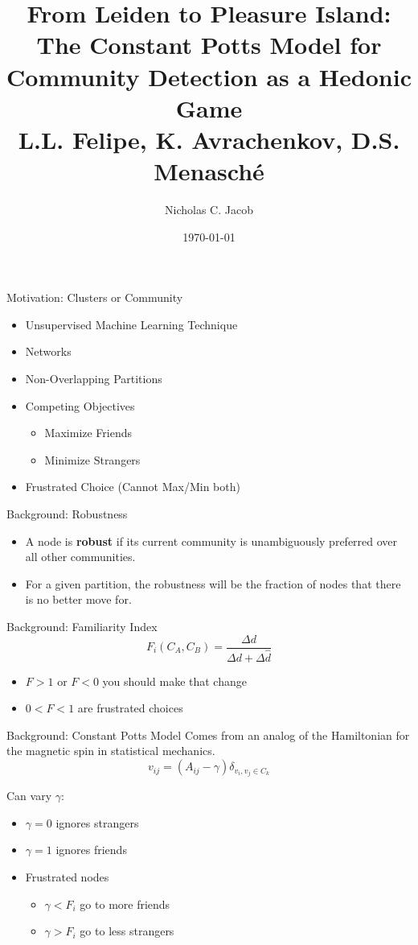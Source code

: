 \documentclass[xcolor=pdftex,dvipsnames,table]{beamer}
\title[Community Detection] 
{From Leiden to Pleasure Island:  The Constant Potts Model for Community Detection as a Hedonic Game\\ L.L. Felipe, K. Avrachenkov, D.S. Menasch\'e}
\author{Nicholas C. Jacob}
\date{\today}
\begin{document}
\begin{frame}
\maketitle
\nocite{FELIPE2025130989}
\end{frame}
\begin{frame}{Motivation:  Clusters or Community}
\begin{itemize}
\item Unsupervised Machine Learning Technique
\item Networks
\item Non-Overlapping Partitions
\item Competing Objectives
\begin{itemize}
\item Maximize Friends
\item Minimize Strangers
\end{itemize} 
\item Frustrated Choice (Cannot Max/Min both)
\end{itemize}
\end{frame}

\begin{frame}{Background:  Robustness}
\begin{itemize}
\item A node is {\bf robust} if its current community is unambiguously preferred over all other communities.

\item For a given partition, the robustness will be the fraction of nodes that there is no better move for.
\end{itemize}
\end{frame}
\begin{frame}{Background:  Familiarity Index}
\[
F_i(C_A,C_B) = \frac{\Delta d}{\Delta d + \Delta \hat d}
\]
\begin{itemize}
\item $F>1$ or $F<0$ you should make that change
\item $0<F<1$ are frustrated choices
\end{itemize}
\end{frame}

\begin{frame}{Background:  Constant Potts Model}
Comes from an analog of the Hamiltonian for the magnetic spin in statistical mechanics.
\[
v_{ij} = \left(A_{ij} - \gamma\right)\delta_{v_i,v_j\in C_k}
\]

Can vary $\gamma$:
\begin{itemize}
\item $\gamma = 0$ ignores strangers
\item $\gamma = 1$ ignores friends
\item Frustrated nodes 
\begin{itemize}
\item $\gamma<F_i$ go to more friends
\item $\gamma>F_i$ go to less strangers
\end{itemize}
\end{itemize}
\end{frame}
\end{document}
